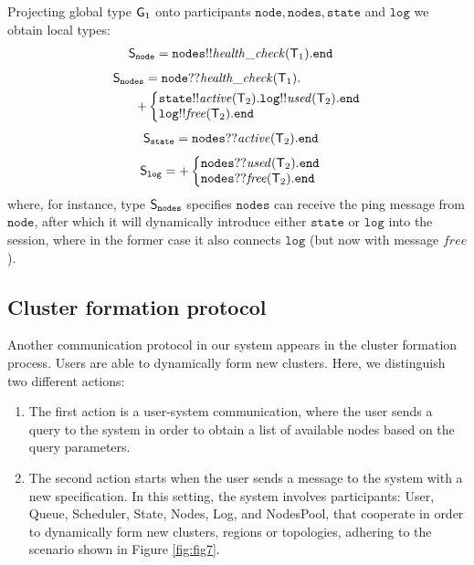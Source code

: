 Projecting global type ${\sf G}_1$ onto participants $\mathtt{node}, \mathtt{nodes}, \mathtt{state}$ and $\mathtt{log}$ we obtain local types:
\begin{align*}
{\mathsf S}_\mathtt{node}  & = 
\mathtt{nodes}{!!}\mathit{health{\_}check}({\mathsf T}_1).\mathtt{end}
\end{align*}
\begin{align*}
\ST_\mathtt{nodes} & = 
\mathtt{node}{??}\mathit{health{\_}check}(\T_1). \\
& \hspace{-2mm}
{+} 
\left\{
\begin{array}{@{}l@{}}
\mathtt{state}{!!}\mathit{active}(\T_2).\mathtt{log}{!!}\mathit{used}(\T_2).\tend\\
\mathtt{log}{!!}\mathit{free}(\T_2).\tend
\end{array} \right.
\end{align*}
\begin{align*}
{\mathsf S}_\mathtt{state} &= 
\mathtt{nodes}{??}\mathit{active}({\mathsf T}_2).\mathtt{end}
\end{align*}
\begin{align*}
\ST_\mathtt{log} &= 
{+}
\left\{
\begin{array}{@{}l@{}}
\mathtt{nodes}{??}\mathit{used}(\T_2).\tend\\
\mathtt{nodes}{??}\mathit{free}(\T_2).\tend
\end{array} \right.
\end{align*}
where, for instance, type ${\mathsf S}_\mathtt{nodes}$ specifies $\mathtt{nodes}$ can receive the ping message from $\mathtt{node}$, after which it will dynamically introduce either $\mathtt{state}$ or $\mathtt{log}$ into the session, where in the former case it also connects $\mathtt{log}$ (but now with message $\mathit{free}$). 
%
%
\subsection{Cluster formation protocol}\label{sec:cluster_formation_protocol}
%
Another communication protocol in our system appears in the cluster formation process. Users are able to dynamically form new clusters. Here, we distinguish two different actions:

\begin{enumerate}[start=1,label={(\bfseries \arabic*)}]
	\item The first action is a user-system communication, where the user sends a query to the system in order to obtain a list of available nodes based on the query parameters.
	\item The second action starts when the user sends a message to the system with a new specification. In this setting, the  system involves participants: User, Queue, Scheduler, State, Nodes, Log, and NodesPool, that cooperate in order to dynamically form new clusters, regions or topologies, adhering to the scenario shown in Figure \ref{fig:fig7}.
\end{enumerate} 

